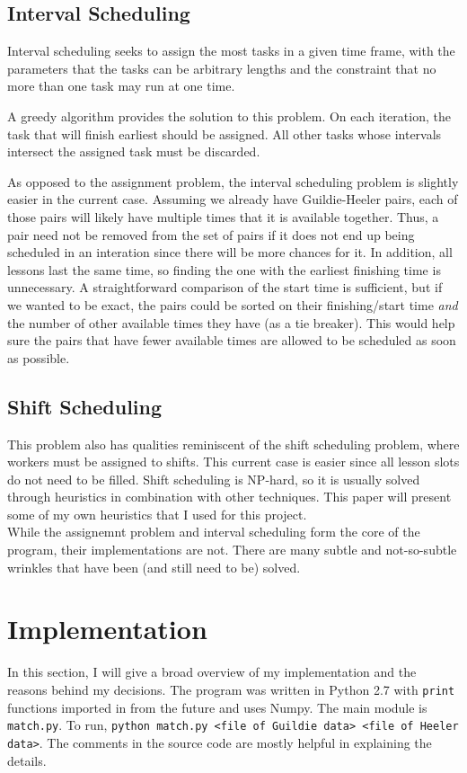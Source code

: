 \documentclass[letterpaper]{article}
\begin{document}
\subsection{Interval Scheduling}
Interval scheduling seeks to assign the most tasks in a given time frame, with the parameters that the tasks can be
arbitrary lengths and the constraint that no more than one task may run at one time.

A greedy algorithm provides the solution to this problem. On each iteration, the task that will finish earliest should
be assigned. All other tasks whose intervals intersect the assigned task must be discarded. 

As opposed to the assignment problem, the interval scheduling problem is slightly easier in the current case. Assuming we already
have Guildie-Heeler pairs, each of those pairs will likely have multiple times that it is available together. Thus, a pair
need not be removed from the set of pairs if it does not end up being scheduled in an interation since there will be
more chances for it. In addition, all lessons last the same time, so finding the one with the earliest finishing time is
unnecessary. A straightforward comparison of the start time is sufficient, but if we wanted to be exact, the pairs could
be sorted on their finishing/start time \textit{and} the number of other available times they have (as a tie breaker).
This would help sure the pairs that have fewer available times are allowed to be scheduled as soon as possible.

\subsection{Shift Scheduling}
This problem also has qualities reminiscent of the shift scheduling problem, where workers must be assigned to shifts. This
current case is easier since all lesson slots do not need to be filled. Shift scheduling is NP-hard, so it is
usually solved through heuristics in combination with other techniques. This paper will present some of my own heuristics
that I used for this project.\\

While the assignemnt problem and interval scheduling form the core of the program, their implementations are not. There are many subtle and
not-so-subtle wrinkles that have been (and still need to be) solved.

\section{Implementation}
In this section, I will give a broad overview of my implementation and the reasons behind my decisions. The program was
written in Python 2.7 with \texttt{print} functions imported in from the future and uses Numpy. The main module is
\texttt{match.py}. To run, \texttt{python match.py <file of Guildie data> <file of Heeler data>}. The comments in the
source code are mostly helpful in explaining the details.
\end{document}
